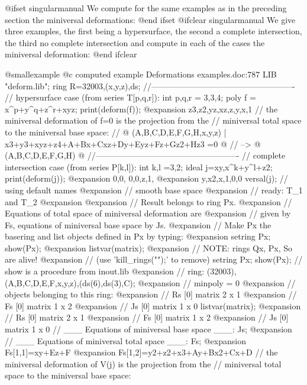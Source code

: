 @ifset singularmanual
We compute for the same examples as in the preceding section
the miniversal deformations:
@end ifset
@ifclear singularmanual
We give three examples, the first being a hypersurface, the second a
complete intersection, the third no complete intersection and compute
in each of the cases the miniversal deformation:
@end ifclear

@smallexample
@c computed example Deformations examples.doc:787 
  LIB "deform.lib";
  ring R=32003,(x,y,z),ds;
  //----------------------------------------------------
  // hypersurface case (from series T[p,q,r]):
  int p,q,r = 3,3,4;
  poly f = x^p+y^q+z^r+xyz;
  print(deform(f));
@expansion{} z3,z2,yz,xz,z,y,x,1
  // the miniversal deformation of f=0 is the projection from the
  // miniversal total space to the miniversal base space:
  // @{ (A,B,C,D,E,F,G,H,x,y,z) | x3+y3+xyz+z4+A+Bx+Cxz+Dy+Eyz+Fz+Gz2+Hz3 =0 @}
  //  --> @{ (A,B,C,D,E,F,G,H) @}
  //----------------------------------------------------
  // complete intersection case (from series P[k,l]):
  int k,l =3,2;
  ideal j=xy,x^k+y^l+z2;
  print(deform(j));
@expansion{} 0,0, 0,0,z,1,
@expansion{} y,x2,x,1,0,0 
  versal(j);                  // using default names
@expansion{} // smooth base space
@expansion{} // ready: T_1 and T_2
@expansion{} 
@expansion{} // Result belongs to ring Px.
@expansion{} // Equations of total space of miniversal deformation are 
@expansion{} // given by Fs, equations of miniversal base space by Js.
@expansion{} // Make Px the basering and list objects defined in Px by typing:
@expansion{}    setring Px; show(Px);
@expansion{}    listvar(matrix);
@expansion{} // NOTE: rings Qx, Px, So are alive!
@expansion{} // (use 'kill_rings("");' to remove)
  setring Px;
  show(Px);                   // show is a procedure from inout.lib
@expansion{} // ring: (32003),(A,B,C,D,E,F,x,y,z),(ds(6),ds(3),C);
@expansion{} // minpoly = 0
@expansion{} // objects belonging to this ring:
@expansion{} // Rs                   [0]  matrix 2 x 1
@expansion{} // Fs                   [0]  matrix 1 x 2
@expansion{} // Js                   [0]  matrix 1 x 0
  listvar(matrix);
@expansion{} // Rs                   [0]  matrix 2 x 1
@expansion{} // Fs                   [0]  matrix 1 x 2
@expansion{} // Js                   [0]  matrix 1 x 0
  // ___ Equations of miniversal base space ___:
  Js;
@expansion{} 
  // ___ Equations of miniversal total space ___:
  Fs;
@expansion{} Fs[1,1]=xy+Ez+F
@expansion{} Fs[1,2]=y2+z2+x3+Ay+Bx2+Cx+D
  // the miniversal deformation of V(j) is the projection from the
  // miniversal total space to the miniversal base space:
